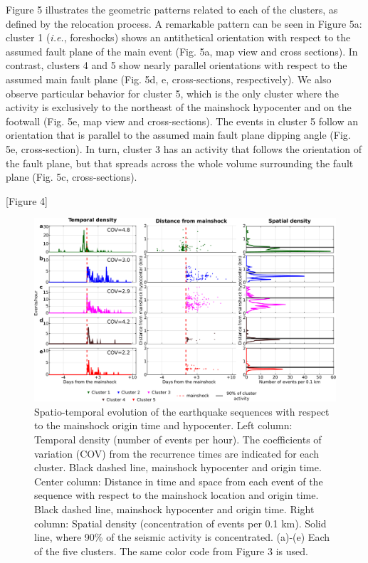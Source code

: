 \documentclass[a4paper,12pt,twoside]{article}
\begin{document}
Figure 5 illustrates the geometric patterns related to each of the clusters, as defined by the relocation process. A remarkable pattern can be seen in Figure 5a: cluster 1 (\emph{i.e.}, foreshocks) shows an antithetical orientation with respect to the assumed fault plane of the main event (Fig. 5a, map view and cross sections). In contrast, clusters 4 and 5 show nearly parallel orientations with respect to the assumed main fault plane (Fig. 5d, e, cross-sections, respectively). We also observe particular behavior for cluster 5, which is the only cluster where the activity is exclusively to the northeast of the mainshock hypocenter and on the footwall (Fig. 5e, map view and cross-sections). The events in cluster 5 follow an orientation that is parallel to the assumed main fault plane dipping angle (Fig. 5e, cross-section). In turn, cluster 3 has an activity that follows the orientation of the fault plane, but that spreads across the whole volume surrounding the fault plane (Fig. 5c, cross-sections).

\begin{center}
   [Figure 4]
\end{center}

\begin{figure}
    \centering
     \includegraphics[width=1\linewidth]{densities_plot.pdf}         \caption{Spatio-temporal evolution of the earthquake sequences with respect to the mainshock origin time and hypocenter. Left column: Temporal density (number of events per hour). The coefficients of variation (COV) from the recurrence times are indicated for each cluster. Black dashed line, mainshock hypocenter and origin time. Center column: Distance in time and space from each event of the sequence with respect to the mainshock location and origin time. Black dashed line, mainshock hypocenter and origin time. Right column: Spatial density (concentration of events per 0.1 km). Solid line, where 90\% of the seismic activity is concentrated. (a)-(e) Each of the five clusters. The same color code from Figure 3 is used.}
\end{figure}     \label{fig:time_each_cluster}
\end{document}
